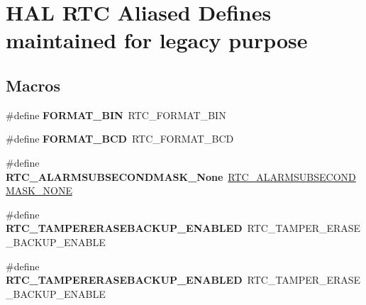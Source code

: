 \hypertarget{group___h_a_l___r_t_c___aliased___defines}{}\section{H\+AL R\+TC Aliased Defines maintained for legacy purpose}
\label{group___h_a_l___r_t_c___aliased___defines}
\subsection*{Macros}
\begin{DoxyCompactItemize}
\item 
\#define {\bfseries F\+O\+R\+M\+A\+T\+\_\+\+B\+IN}~R\+T\+C\+\_\+\+F\+O\+R\+M\+A\+T\+\_\+\+B\+IN\hypertarget{group___h_a_l___r_t_c___aliased___defines_ga1adf0882a1368a3cef0edc34dcf8d34e}{}\label{group___h_a_l___r_t_c___aliased___defines_ga1adf0882a1368a3cef0edc34dcf8d34e}

\item 
\#define {\bfseries F\+O\+R\+M\+A\+T\+\_\+\+B\+CD}~R\+T\+C\+\_\+\+F\+O\+R\+M\+A\+T\+\_\+\+B\+CD\hypertarget{group___h_a_l___r_t_c___aliased___defines_ga950fc88b539cc9a8cf66aab2ee860fe1}{}\label{group___h_a_l___r_t_c___aliased___defines_ga950fc88b539cc9a8cf66aab2ee860fe1}

\item 
\#define {\bfseries R\+T\+C\+\_\+\+A\+L\+A\+R\+M\+S\+U\+B\+S\+E\+C\+O\+N\+D\+M\+A\+S\+K\+\_\+\+None}~\hyperlink{group___r_t_c___alarm___sub___seconds___masks___definitions_ga2c3802d48626766a3fc85ad910caea02}{R\+T\+C\+\_\+\+A\+L\+A\+R\+M\+S\+U\+B\+S\+E\+C\+O\+N\+D\+M\+A\+S\+K\+\_\+\+N\+O\+NE}\hypertarget{group___h_a_l___r_t_c___aliased___defines_ga242adf20d2422fd1ae7715b8acd82623}{}\label{group___h_a_l___r_t_c___aliased___defines_ga242adf20d2422fd1ae7715b8acd82623}

\item 
\#define {\bfseries R\+T\+C\+\_\+\+T\+A\+M\+P\+E\+R\+E\+R\+A\+S\+E\+B\+A\+C\+K\+U\+P\+\_\+\+E\+N\+A\+B\+L\+ED}~R\+T\+C\+\_\+\+T\+A\+M\+P\+E\+R\+\_\+\+E\+R\+A\+S\+E\+\_\+\+B\+A\+C\+K\+U\+P\+\_\+\+E\+N\+A\+B\+LE\hypertarget{group___h_a_l___r_t_c___aliased___defines_ga4a78a492baabe7132ddfcf94cf7805c0}{}\label{group___h_a_l___r_t_c___aliased___defines_ga4a78a492baabe7132ddfcf94cf7805c0}

\item 
\#define {\bfseries R\+T\+C\+\_\+\+T\+A\+M\+P\+E\+R\+E\+R\+A\+S\+E\+B\+A\+C\+K\+U\+P\+\_\+\+E\+N\+A\+B\+L\+ED}~R\+T\+C\+\_\+\+T\+A\+M\+P\+E\+R\+\_\+\+E\+R\+A\+S\+E\+\_\+\+B\+A\+C\+K\+U\+P\+\_\+\+E\+N\+A\+B\+LE\hypertarget{group___h_a_l___r_t_c___aliased___defines_ga4a78a492baabe7132ddfcf94cf7805c0}{}\label{group___h_a_l___r_t_c___aliased___defines_ga4a78a492baabe7132ddfcf94cf7805c0}


\end{DoxyCompactItemize}
